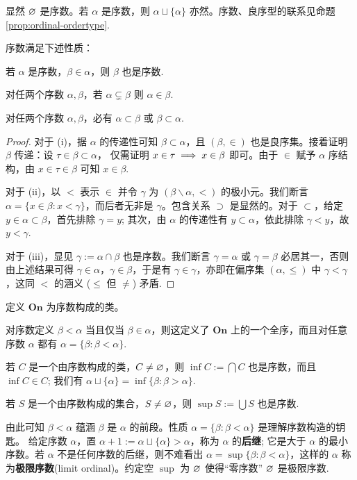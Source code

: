 显然 $\varnothing$ 是序数。若 $\alpha$ 是序数，则 $\alpha \sqcup \{\alpha\}$ 亦然。序数、良序型的联系见命题 \ref{prop:ordinal-ordertype}.

\begin{lemma}\label{prop:ordinal-property}
	序数满足下述性质：
	\begin{compactenum}[(i)]
		\item 若 $\alpha$ 是序数，$\beta \in \alpha$，则 $\beta$ 也是序数.
		\item 对任两个序数 $\alpha,\beta$，若 $\alpha \subsetneq \beta$ 则 $\alpha \in \beta$.
		\item 对任两个序数 $\alpha,\beta$，必有 $\alpha \subset \beta$ 或 $\beta \subset \alpha$.
	\end{compactenum}
\end{lemma}
\begin{proof}
	对于 (i)，据 $\alpha$ 的传递性可知 $\beta \subset \alpha$，且 $(\beta,\in)$ 也是良序集。接着证明 $\beta$ 传递：设 $\tau \in \beta \subset \alpha$， 仅需证明 $x \in \tau \implies x \in \beta$ 即可。由于 $\in$ 赋予 $\alpha$ 序结构，由 $x \in \tau \in \beta$ 可知 $x \in \beta$.

	对于 (ii)，以 $<$ 表示 $\in$ 并令 $\gamma$ 为 $(\beta \backslash \alpha, <)$ 的极小元。我们断言 $\alpha = \{x \in \beta : x < \gamma \}$，而后者无非是 $\gamma$。包含关系 $\supset$ 是显然的。对于 $\subset$，给定 $y \in \alpha \subset \beta$，首先排除 $\gamma = y$; 其次，由 $\alpha$ 的传递性有 $y \subset \alpha$，依此排除 $\gamma < y$，故 $y < \gamma$.

	对于 (iii)，显见 $\gamma := \alpha \cap \beta$ 也是序数。我们断言 $\gamma = \alpha$ 或 $\gamma = \beta$ 必居其一，否则由上述结果可得 $\gamma \in \alpha$，$\gamma \in \beta$，于是有 $\gamma \in \gamma$，亦即在偏序集 $(\alpha,\leqslant)$ 中 $\gamma < \gamma$，这同 $<$ 的涵义 ($\leqslant$ 但 $\neq$) 矛盾.
\end{proof}

\begin{theorem}\label{prop:On-wellorder}
	定义 $\mathbf{On}$ 为序数构成的类。
	\begin{compactitem}
		\item 对序数定义 $\beta < \alpha$ 当且仅当 $\beta \in \alpha$，则这定义了 $\mathbf{On}$ 上的一个全序，而且对任意序数 $\alpha$ 都有 $\alpha = \{ \beta : \beta < \alpha \}$.
		\item 若 $C$ 是一个由序数构成的类，$C \neq \varnothing$，则 $\inf C := \bigcap C$ 也是序数，而且 $\inf C \in C$; 我们有 $\alpha \sqcup \{\alpha\} = \inf\{ \beta: \beta > \alpha \}$.
		\item 若 $S$ 是一个由序数构成的集合，$S \neq \varnothing$，则 $\sup S := \bigcup S$ 也是序数.
	\end{compactitem}
\end{theorem}
由此可知 $\beta < \alpha$ 蕴涵 $\beta$ 是 $\alpha$ 的前段。性质 $\alpha = \{\beta: \beta < \alpha \}$ 是理解序数构造的钥匙。
给定序数 $\alpha$，置 $\alpha + 1 := \alpha \sqcup \{\alpha\} > \alpha$，称为 $\alpha$ 的\textbf{后继}; 它是大于 $\alpha$ 的最小序数。若 $\alpha$ 不是任何序数的后继，则不难看出 $\alpha = \sup\{\beta: \beta < \alpha\}$，这样的 $\alpha$ 称为\textbf{极限序数}(limit ordinal)。约定空 $\sup$ 为 $\varnothing$ 使得“零序数” $\varnothing$ 是极限序数.

